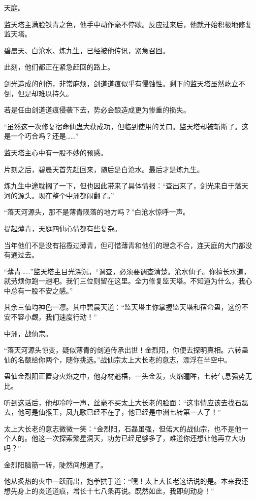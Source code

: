 \begin{this_body}
天庭。

监天塔主满脸铁青之色，他手中动作毫不停歇。反应过来后，他就开始积极地修复监天塔。

碧晨天、白沧水、炼九生，已经被他传讯，紧急召回。

此刻，他们都正在紧急赶回的路上。

剑光造成的创伤，非常麻烦，剑道道痕似乎有侵蚀性。剩下的监天塔虽然屹立不倒，但是却难以持久。

若是任由剑道道痕侵袭下去，势必会酿造成更为惨重的损失。

“虽然这一次修复宿命仙蛊大获成功，但临到使用的关口。监天塔却被斩断了。这是一个巧合吗？还是……”

监天塔主心中有一股不妙的预感。

片刻之后，碧晨天首先赶回来，随后是白沧水。最后才是炼九生。

炼九生中途耽搁了一下，但也因此带来了具体情报：“查出来了，剑光来自于落天河的源头。现在整个中洲都闹翻了。”

“落天河源头，那不是薄青陨落的地方吗？”白沧水惊呼一声。

提起薄青，天庭四仙心情都有些复杂。

当年他们不是没有招揽过薄青，但可惜薄青和他们的理念不合，连天庭的大门都没有通过去。

“薄青……”监天塔主目光深沉，“调查，必须要调查清楚。沧水仙子。你擅长水道，就劳烦你跑一趟吧。我们三位则留在这里。全力修复监天塔。不知道为什么，我心中总有一股不安之感。”

其余三仙均神色一凛。其中碧晨天道：“监天塔主你掌握监天塔和宿命蛊，这份不安不容小觑，我们速度行动！”

中洲，战仙宗。

“落天河源头惊变，疑似薄青的剑道传承出世！金烈阳，你便去探明真相。六转蛊仙的名额给你两个，随你挑选。”战仙宗太上大长老的意志，漂浮在半空中。

蛊仙金烈阳正置身火焰之中，他身材魁梧，一头金发，火焰瞳眸，七转气息强势无比。

听到这话后，他却冷哼一声，丝毫不买太上大长老的脸面：“这事情应该去找石磊去，他可是仙猴王，凤九歌已经不在了，他已经是中洲七转第一人了！”

太上大长老的意志微微一笑：“金烈阳，石磊虽强，但偌大的战仙宗，也不是他一个人的。他这一次探索繁星洞天，功劳已经足够多了，难道你还想让他再立大功吗？”

金烈阳脑筋一转，陡然间想通了。

他从炙热的火中一跃而出，抱拳拱手道：“嘿！太上大长老这话说的是。本来我还想先身上的炎道道痕，增长十七八条再说。既然如此，我即刻动身！”


\end{this_body}
